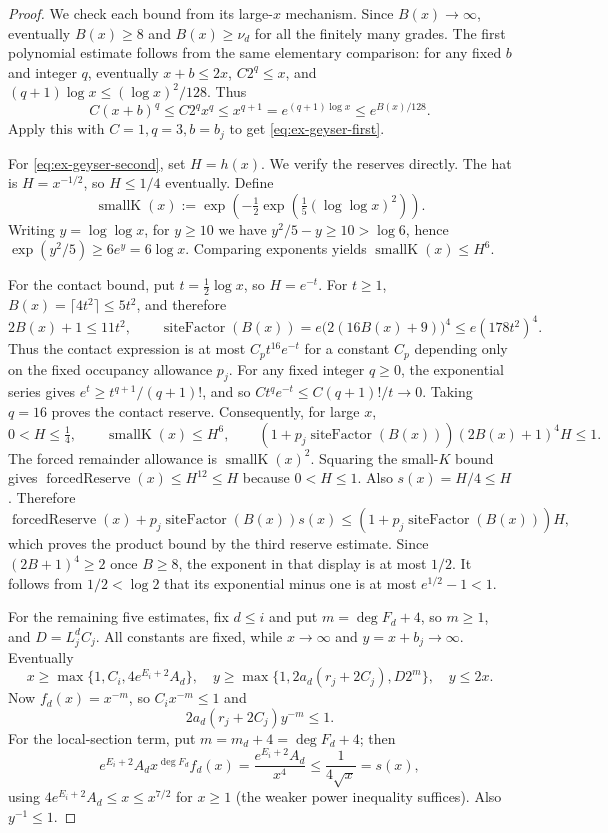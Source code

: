 \begin{proof}
We check each bound from its large-$x$ mechanism. Since $B(x)\to\infty$, eventually $B(x)\geq8$ and $B(x)\geq\nu_d$ for all the finitely many grades. The first polynomial estimate follows from the same elementary comparison: for any fixed $b$ and integer $q$, eventually $x+b\leq2x$, $C2^q\leq x$, and $(q+1)\log x\leq(\log x)^2/128$. Thus
\[
 C(x+b)^q\leq C2^q x^q\leq x^{q+1}
 =e^{(q+1)\log x}\leq e^{B(x)/128}.
\]
Apply this with $C=1,q=3,b=b_j$ to get \eqref{eq:ex-geyser-first}.

For \eqref{eq:ex-geyser-second}, set $H=h(x)$. We verify the reserves
directly. The hat is $H=x^{-1/2}$, so $H\leq1/4$ eventually. Define
\[
 \operatorname{smallK}(x):=\exp\!\left(-\tfrac12
       \exp\!\left(\tfrac15(\log\log x)^2\right)\right).
\]
Writing $y=\log\log x$, for $y\geq10$ we have
$y^2/5-y\geq10>\log6$, hence
$\exp(y^2/5)\geq6e^y=6\log x$. Comparing exponents yields
$\operatorname{smallK}(x)\leq H^6$.

For the contact bound, put $t=\frac12\log x$, so $H=e^{-t}$. For $t\geq1$,
$B(x)=\lceil4t^2\rceil\leq5t^2$, and therefore
\[
2B(x)+1\leq11t^2,\qquad
\operatorname{siteFactor}(B(x))
=e\bigl(2(16B(x)+9)\bigr)^4\leq e(178t^2)^4.
\]
Thus the contact expression is at most $C_p t^{16}e^{-t}$ for a constant
$C_p$ depending only on the fixed occupancy allowance $p_j$. For any fixed integer $q\geq0$,
the exponential series gives $e^t\geq t^{q+1}/(q+1)!$, and so
$C t^qe^{-t}\leq C(q+1)!/t\to0$. Taking $q=16$ proves the contact
reserve. Consequently, for large $x$,
\[
 0<H\leq\tfrac14,\qquad \operatorname{smallK}(x)\leq H^6,
 \qquad (1+p_j\operatorname{siteFactor}(B(x)))(2B(x)+1)^4H\leq1.
\]
The forced remainder allowance is $\operatorname{smallK}(x)^2$. Squaring the small-$K$ bound gives $\operatorname{forcedReserve}(x)\leq H^{12}\leq H$ because $0<H\leq1$. Also $s(x)=H/4\leq H$. Therefore
\[
 \operatorname{forcedReserve}(x)+p_j\operatorname{siteFactor}(B(x))s(x)
 \leq (1+p_j\operatorname{siteFactor}(B(x)))H,
\]
which proves the product bound by the third reserve estimate. Since $(2B+1)^4\geq2$ once $B\geq8$, the exponent in that display is at most $1/2$. It follows from $1/2<\log2$ that its exponential minus one is at most $e^{1/2}-1<1$.

For the remaining five estimates, fix $d\leq i$ and put $m=\deg F_d+4$, so $m\geq1$, and $D=L_j^d C_j$. All constants are fixed, while $x\to\infty$ and $y=x+b_j\to\infty$. Eventually
\[
 x\geq\max\{1,C_i,4e^{E_i+2}A_d\},\quad
 y\geq\max\{1,2a_d(r_j+2C_j),D2^m\},\quad y\leq2x.
\]
Now $f_d(x)=x^{-m}$, so $C_ix^{-m}\leq1$ and
\[
 2a_d(r_j+2C_j)y^{-m}\leq1.
\]
For the local-section term, put $m=m_d+4=\deg F_d+4$; then
\[
 e^{E_i+2}A_d x^{\deg F_d}f_d(x)
 =\frac{e^{E_i+2}A_d}{x^4}
 \leq\frac{1}{4\sqrt{x}}=s(x),
\]
using $4e^{E_i+2}A_d\leq x\leq x^{7/2}$ for $x\geq1$ (the weaker power inequality suffices). Also $y^{-1}\leq1$.


\end{proof}
